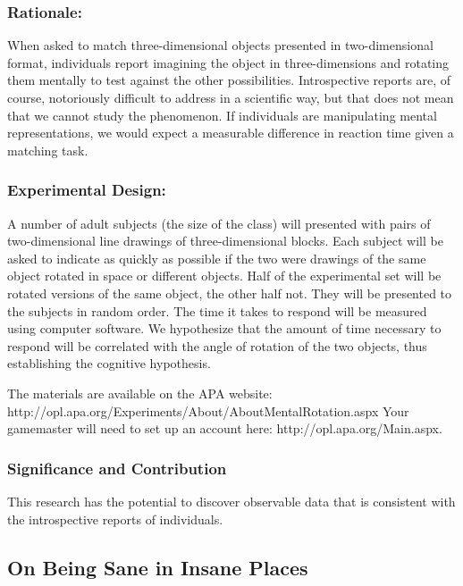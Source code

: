 \begin{refsection}
\subsubsection{Rationale:}
\label{rationale:}

When asked to match three-dimensional objects presented in two-dimensional format, individuals report imagining the object in three-dimensions and rotating them mentally to test against the other possibilities. Introspective reports are, of course, notoriously difficult to address in a scientific way, but that does not mean that we cannot study the phenomenon. If individuals are manipulating mental representations, we would expect a measurable difference in reaction time given a matching task.

\subsubsection{Experimental Design:}
\label{experimentaldesign:}

A number of adult subjects (the size of the class) will presented with pairs of two-dimensional line drawings of three-dimensional blocks. Each subject will be asked to indicate as quickly as possible if the two were drawings of the same object rotated in space or different objects. Half of the experimental set will be rotated versions of the same object, the other half not. They will be presented to the subjects in random order. The time it takes to respond will be measured using computer software. We hypothesize that the amount of time necessary to respond will be correlated with the angle of rotation of the two objects, thus establishing the cognitive hypothesis.

The materials are available on the APA website: http:\slash \slash opl.apa.org\slash Experiments\slash About\slash AboutMentalRotation.aspx Your gamemaster will need to set up an account here: http:\slash \slash opl.apa.org\slash Main.aspx.

\subsubsection{Significance and Contribution}
\label{significanceandcontribution}

This research has the potential to discover observable data that is consistent with the introspective reports of individuals. 

\newpage

\subsection{On Being Sane in Insane Places}
\label{onbeingsaneininsaneplaces}


\end{refsection}
